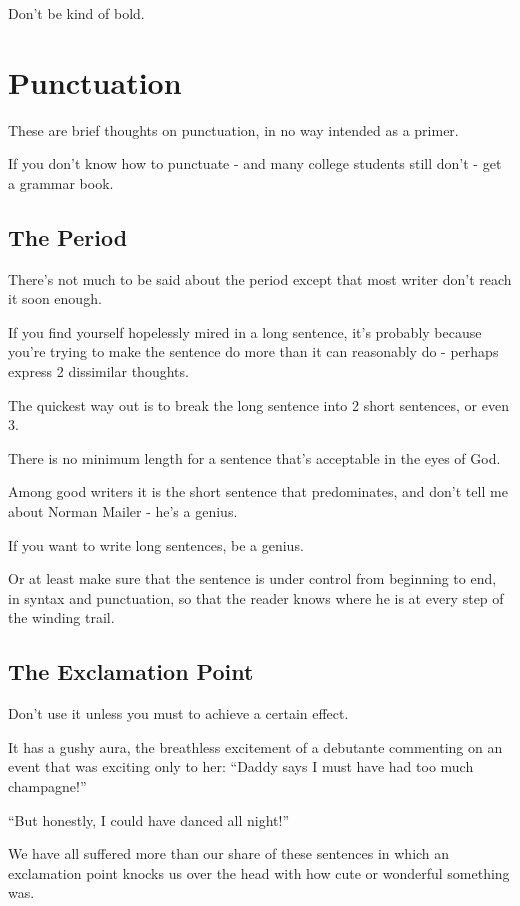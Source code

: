 \documentclass{book}
\numberwithin{equation}{section}
\begin{document}
Don't be kind of bold.


\section{Punctuation}
These are brief thoughts on punctuation, in no way intended as a primer.

If you don't know how to punctuate - and many college students still don't - get a grammar book.

\subsection{The Period}
There's not much to be said about the period except that most writer don't reach it soon enough.

If you find yourself hopelessly mired in a long sentence, it's probably because you're trying to make the sentence do more than it can reasonably do - perhaps express 2 dissimilar thoughts.

The quickest way out is to break the long sentence into 2 short sentences, or even 3.

There is no minimum length for a sentence that's acceptable in the eyes of God.

Among good writers it is the short sentence that predominates, and don't tell me about Norman Mailer - he's a genius.

If you want to write long sentences, be a genius.

Or at least make sure that the sentence is under control from beginning to end, in syntax and punctuation, so that the reader knows where he is at every step of the winding trail.

\subsection{The Exclamation Point}
Don't use it unless you must to achieve a certain effect.

It has a gushy aura, the breathless excitement of a debutante commenting on an event that was exciting only to her: ``Daddy says I must have had too much champagne!''

``But honestly, I could have danced all night!''

We have all suffered more than our share of these sentences in which an exclamation point knocks us over the head with how cute or wonderful something was.
\end{document}
